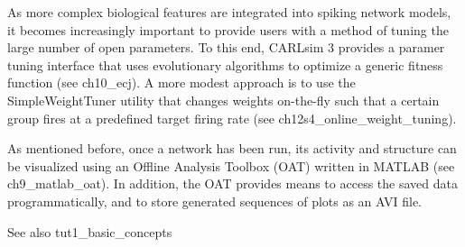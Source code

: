 As more complex biological features are integrated into spiking network models, it becomes increasingly important to provide users with a method of tuning the large number of open parameters. To this end, C\+A\+R\+Lsim 3 provides a paramer tuning interface that uses evolutionary algorithms to optimize a generic fitness function (see ch10\+\_\+ecj). A more modest approach is to use the Simple\+Weight\+Tuner utility that changes weights on-\/the-\/fly such that a certain group fires at a predefined target firing rate (see ch12s4\+\_\+online\+\_\+weight\+\_\+tuning).

As mentioned before, once a network has been run, its activity and structure can be visualized using an Offline Analysis Toolbox (O\+AT) written in M\+A\+T\+L\+AB (see ch9\+\_\+matlab\+\_\+oat). In addition, the O\+AT provides means to access the saved data programmatically, and to store generated sequences of plots as an A\+VI file.

\begin{DoxySeeAlso}{See also}
tut1\+\_\+basic\+\_\+concepts 
\end{DoxySeeAlso}
